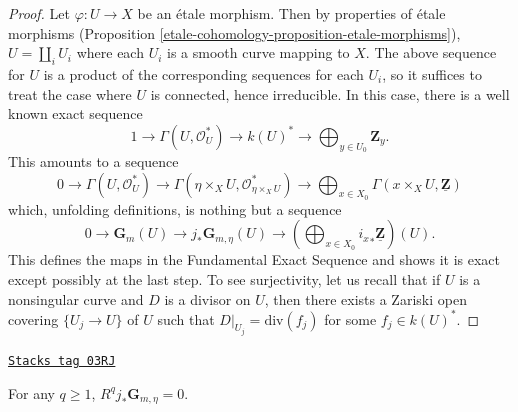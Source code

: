 \begin{proof}
Let $\varphi : U \to X$ be an \'etale morphism. Then by properties of
\'etale morphisms (Proposition \ref{etale-cohomology-proposition-etale-morphisms}),
$U = \coprod_i U_i$ where each $U_i$ is a smooth curve mapping to $X$.
The above sequence for $U$ is a product of the corresponding sequences
for each $U_i$, so it suffices to treat the case where $U$ is connected,
hence irreducible. In this case, there is a well known exact sequence
$$
1 \longrightarrow
\Gamma(U, \mathcal{O}_U^*) \longrightarrow
k(U)^* \longrightarrow \bigoplus\nolimits_{y \in U_0} \mathbf{Z}_y.
$$
This amounts to a sequence
$$
0 \longrightarrow \Gamma(U, \mathcal{O}_U^*) \longrightarrow
\Gamma(\eta \times_X U, \mathcal{O}_{\eta \times_X U}^*) \longrightarrow
\bigoplus\nolimits_{x \in X_0}
\Gamma(x \times_X U, \underline{\mathbf{Z}})
$$
which, unfolding definitions, is nothing but a sequence
$$
0 \longrightarrow \mathbf{G}_m(U) \longrightarrow
j_* \mathbf{G}_{m, \eta}(U) \longrightarrow
\left(\bigoplus\nolimits_{x \in X_0} {i_x}_* \underline{\mathbf{Z}}\right)(U).
$$
This defines the maps in the Fundamental Exact Sequence and shows it is exact
except possibly at the last step. To see surjectivity, let us recall that if
$U$ is a nonsingular curve and $D$ is a divisor on $U$,
then there exists a Zariski open covering $\{U_j \to U\}$ of $U$
such that $D|_{U_j} = \text{div}(f_j)$ for some $f_j \in k(U)^*$.
\end{proof}

\begin{lemma}
\label{etale-cohomology-lemma-higher-direct-jstar-Gm}
\href{https://stacks.math.columbia.edu/tag/03RJ}{\texttt{Stacks tag 03RJ}}

For any $q \geq 1$, $R^q j_*\mathbf{G}_{m, \eta} = 0$.
\end{lemma}

